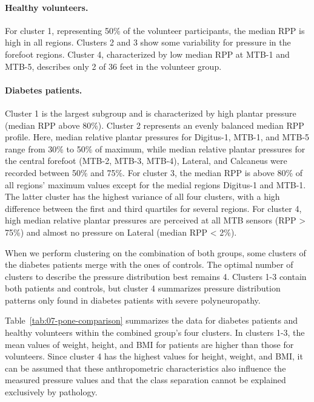 \documentclass[
  oneside]{book}
\begin{document}
\paragraph*{Healthy volunteers.}

For cluster 1, representing 50\% of the volunteer participants, the median RPP is high in all regions.
Clusters 2 and 3 show some variability for pressure in the forefoot regions.
Cluster 4, characterized by low median RPP at MTB-1 and MTB-5, describes only 2 of 36 feet in the volunteer group.

\paragraph*{Diabetes patients.}

Cluster 1 is the largest subgroup and is characterized by high plantar pressure (median RPP above 80\%).
Cluster 2 represents an evenly balanced median RPP profile.
Here, median relative plantar pressures for Digitus-1, MTB-1, and MTB-5 range from 30\% to 50\% of maximum, while median relative plantar pressures for the central forefoot (MTB-2, MTB-3, MTB-4), Lateral, and Calcaneus were recorded between 50\% and 75\%.
For cluster 3, the median RPP is above 80\% of all regions' maximum values except for the medial regions Digitus-1 and MTB-1.
The latter cluster has the highest variance of all four clusters, with a high difference between the first and third quartiles for several regions.
For cluster 4, high median relative plantar pressures are perceived at all MTB sensors (RPP \textgreater{} 75\%) and almost no pressure on Lateral (median RPP \textless{} 2\%).

When we perform clustering on the combination of both groups, some clusters of the diabetes patients merge with the ones of controls.
The optimal number of clusters to describe the pressure distribution best remains 4.
Clusters 1-3 contain both patients and controls, but cluster 4 summarizes pressure distribution patterns only found in diabetes patients with severe polyneuropathy.

Table~\ref{tab:07-pone-comparison} summarizes the data for diabetes patients and healthy volunteers within the combined group's four clusters.
In clusters 1-3, the mean values of weight, height, and BMI for patients are higher than those for volunteers.
Since cluster 4 has the highest values for height, weight, and BMI, it can be assumed that these anthropometric characteristics also influence the measured pressure values and that the class separation cannot be explained exclusively by pathology.
\end{document}
